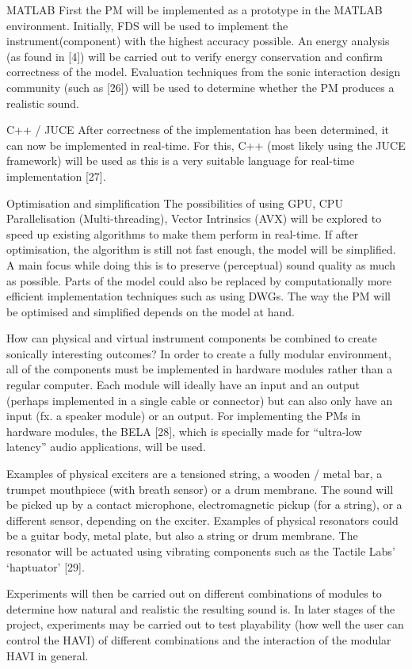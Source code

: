 MATLAB
First the PM will be implemented as a prototype in the MATLAB environment. Initially, FDS will be used to implement the instrument(component) with the highest accuracy possible. An energy analysis (as found in [4]) will be carried out to verify energy conservation and confirm correctness of the model. Evaluation techniques from the sonic interaction design community (such as [26]) will be used to determine whether the PM produces a realistic sound.

C++ / JUCE
After correctness of the implementation has been determined, it can now be implemented in real-time. For this, C++ (most likely using the JUCE framework) will be used as this is a very suitable language for real-time implementation [27].

Optimisation and simplification
The possibilities of using GPU, CPU Parallelisation (Multi-threading), Vector Intrinsics (AVX) will be explored to speed up existing algorithms to make them perform in real-time. If after optimisation, the algorithm is still not fast enough, the model will be simplified. A main focus while doing this is to preserve (perceptual) sound quality as much as possible. Parts of the model could also be replaced by computationally more efficient implementation techniques such as using DWGs. The way the PM will be optimised and simplified depends on the model at hand. 

How can physical and virtual instrument components be combined to create sonically interesting outcomes?
In order to create a fully modular environment, all of the components must be implemented in hardware modules rather than a regular computer. Each module will ideally have an input and an output (perhaps implemented in a single cable or connector) but can also only have an input (fx. a speaker module) or an output. For implementing the PMs in hardware modules, the BELA [28], which is specially made for “ultra-low latency” audio applications, will be used.

Examples of physical exciters are a tensioned string, a wooden / metal bar, a trumpet mouthpiece (with breath sensor) or a drum membrane. The sound will be picked up by a contact microphone, electromagnetic pickup (for a string), or a different sensor, depending on the exciter. Examples of physical resonators could be a guitar body, metal plate, but also a string or drum membrane. The resonator will be actuated using vibrating components such as the Tactile Labs’ ‘haptuator’ [29]. 

Experiments will then be carried out on different combinations of modules to determine how natural and realistic the resulting sound is. In later stages of the project, experiments may be carried out to test playability (how well the user can control the HAVI) of different combinations and the interaction of the modular HAVI in general. 


